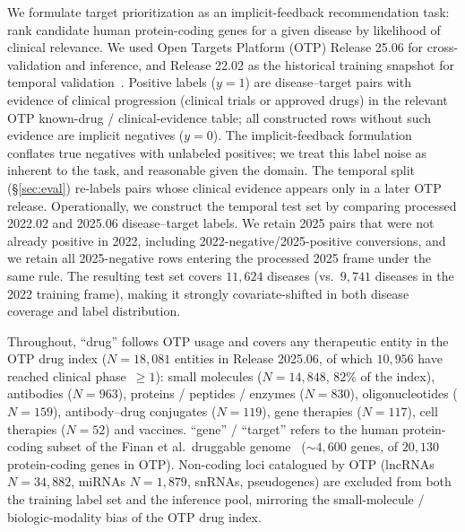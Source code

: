\documentclass{article}
\begin{document}
We formulate target prioritization as an implicit-feedback recommendation
task: rank candidate human protein-coding genes for a given disease by
likelihood of clinical relevance.
We used Open Targets Platform (OTP) Release 25.06 for cross-validation
and inference, and Release 22.02 as the historical training snapshot for
temporal validation~\citep{buniello2025,opentargetsdownloads,opentargets2202release,opentargets2506release}.
Positive labels ($y{=}1$) are disease--target pairs with evidence of
clinical progression (clinical trials or approved drugs) in the relevant
OTP known-drug / clinical-evidence table; all constructed rows without
such evidence are implicit negatives ($y{=}0$).
The implicit-feedback formulation conflates true negatives with unlabeled
positives; we treat this label noise as inherent to the task, and reasonable given the domain.
The temporal split (\S\ref{sec:eval}) re-labels pairs whose clinical evidence appears only in a later OTP release.
Operationally, we construct the temporal test set by comparing processed 2022.02 and 2025.06 disease–target labels. We retain 2025 pairs that were not already positive in 2022, including 2022-negative/2025-positive conversions, and we retain all 2025-negative rows entering the processed 2025 frame under the same rule.
The resulting test set covers $11{,}624$ diseases
(vs.\ $9{,}741$ diseases in the 2022 training frame), making it strongly
covariate-shifted in both disease coverage and label distribution.

Throughout, ``drug'' follows OTP usage and covers any therapeutic entity
in the OTP drug index ($N{=}18{,}081$ entities in Release 2025.06,
of which $10{,}956$ have reached clinical phase~${\geq}1$):
small molecules ($N{=}14{,}848$, $82\%$ of the index), antibodies
($N{=}963$), proteins / peptides / enzymes ($N{=}830$),
oligonucleotides ($N{=}159$), antibody--drug conjugates ($N{=}119$),
gene therapies ($N{=}117$), cell therapies ($N{=}52$) and vaccines.
``gene'' / ``target'' refers to the human protein-coding subset of
the Finan et al.\ druggable genome~\citep{finan2017} (${\sim}4{,}600$
genes, of $20{,}130$ protein-coding genes in OTP).
Non-coding loci catalogued by OTP (lncRNAs $N{=}34{,}882$, miRNAs
$N{=}1{,}879$, snRNAs, pseudogenes) are excluded from both the
training label set and the inference pool, mirroring the
small-molecule / biologic-modality bias of the OTP drug index.
\end{document}

